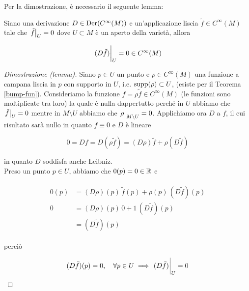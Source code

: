 Per la dimostrazione, è necessario il seguente lemma:

\begin{lemma}
	Siano una derivazione $ D \in \operatorname{Der}(C^{\infty}(M)) $ e un'applicazione liscia $ \tilde{f} \in C^{\infty}(M) $ tale che $ \eval{\tilde{f}}_{U} = 0 $ dove $ U \subset M $ è un aperto della varietà, allora
	
	\begin{equation}
		\eval{(D \tilde{f})}_{U} = 0 \in C^{\infty}(M)
	\end{equation}
\end{lemma}

\begin{proof}[Dimostrazione (lemma)]
	Siano $ p \in U $ un punto e $ \rho \in C^{\infty}(M) $ una funzione a campana liscia in $ p $ con supporto in $ U $, i.e. $ \operatorname{supp}(\rho) \subset U $, (esiste per il Teorema \ref{bump-fun}). Consideriamo la funzione $ f = \rho \tilde{f} \in C^{\infty}(M) $ (le funzioni sono moltiplicate tra loro) la quale è nulla dappertutto perché in $ U $ abbiamo che $ \eval{\tilde{f}}_{U} = 0 $ mentre in $ M \setminus U $ abbiamo che $ \eval{\rho}_{M \setminus U} = 0 $. Applichiamo ora $ D $ a $ f $, il cui risultato sarà nullo in quanto $ f \equiv 0 $ e $ D $ è lineare
	
	\begin{equation}
		0 = D f %
		= D (\rho \tilde{f}) %
		= (D \rho) \tilde{f} + \rho (D \tilde{f})
	\end{equation}

	in quanto $ D $ soddisfa anche Leibniz.\\
	Preso un punto $ p \in U $, abbiamo che $ 0(p) = 0 \in \mathbb{R} $ e
	
	\begin{align}
		\begin{split}
			0(p) &= (D \rho)(p) \, \tilde{f}(p) + \rho(p) \, (D \tilde{f})(p)\\
			0 &= (D \rho)(p) \, 0 + 1 \, (D \tilde{f})(p)\\
			&= (D \tilde{f})(p)
		\end{split}
	\end{align}

	perciò
	
	\begin{equation}
		(D \tilde{f})(p) = 0 \qcomma \forall p \in U %
		\implies %
		\eval{(D \tilde{f})}_{U} = 0
	\end{equation}
\end{proof}

